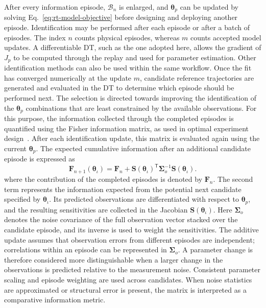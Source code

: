 \documentclass[journal]{IEEEtran}
\begin{document}
After every information episode, $\mathcal B_n$ is enlarged, and $\boldsymbol{\theta}_p$ can be updated by solving Eq.~\eqref{eq:rt-model-objective} before designing and deploying another episode. Identification may be performed after each episode or after a batch of episodes. The index $n$ counts physical episodes, whereas $m$ counts accepted model updates.
A differentiable DT, such as the one adopted here, allows the gradient of $J_p$ to be computed through the replay and used for parameter estimation. Other identification methods can also be used within the same workflow. 
Once the fit has converged numerically at the update $m$, candidate reference trajectories are generated and evaluated in the DT to determine which episode should be performed next. The selection is directed towards improving the identification of the $\boldsymbol{\theta}_p$ combinations that are least constrained by the available observations. For this purpose, the information collected through the completed episodes is quantified using the Fisher information matrix, as used in optimal experiment design~\cite{Mehra1974,Goodwin1977}. After each identification update, this matrix is evaluated again using the current $\boldsymbol{\theta}_p$. The expected cumulative information after an additional candidate episode is expressed as
\begin{equation}
 \mathbf F_{n+1}(\boldsymbol{\theta}_\iota)
 =\mathbf F_n+
 \mathbf S(\boldsymbol{\theta}_\iota)^{\mathsf T}
 \boldsymbol{\Sigma}_o^{-1}
 \mathbf S(\boldsymbol{\theta}_\iota).
 \label{eq:rt-fisher-update}
\end{equation}
where the contribution of the completed episodes is denoted by $\mathbf F_n$. The second term represents the information expected from the potential next candidate specified by $\boldsymbol{\theta}_\iota$. Its predicted observations are differentiated with respect to $\boldsymbol{\theta}_p$, and the resulting sensitivities are collected in the Jacobian $\mathbf S(\boldsymbol{\theta}_\iota)$. Here $\boldsymbol{\Sigma}_o$ denotes the noise covariance of the full observation vector stacked over the candidate episode, and its inverse is used to weight the sensitivities. The additive update assumes that observation errors from different episodes are independent; correlations within an episode can be represented in $\boldsymbol{\Sigma}_o$. A parameter change is therefore considered more distinguishable when a larger change in the observations is predicted relative to the measurement noise. Consistent parameter scaling and episode weighting are used across candidates. When noise statistics are approximated or structural error is present, the matrix is interpreted as a comparative information metric.
\end{document}

